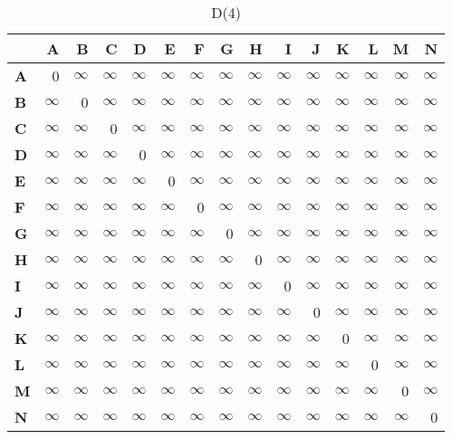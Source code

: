 \documentclass{article}
\newcommand{\INF}{$\infty$}
\begin{document}
\begin{table}[H]\centering
\caption{D(4)}
\begin{tabular}{l r r r r r r r r r r r r r r}
\toprule
 & \textbf{A} & \textbf{B} & \textbf{C} & \textbf{D} & \textbf{E} & \textbf{F} & \textbf{G} & \textbf{H} & \textbf{I} & \textbf{J} & \textbf{K} & \textbf{L} & \textbf{M} & \textbf{N}\\\midrule
\textbf{A} & 0 & \INF & \INF & \INF & \INF & \INF & \INF & \INF & \INF & \INF & \INF & \INF & \INF & \INF \\
\textbf{B} & \INF & 0 & \INF & \INF & \INF & \INF & \INF & \INF & \INF & \INF & \INF & \INF & \INF & \INF \\
\textbf{C} & \INF & \INF & 0 & \INF & \INF & \INF & \INF & \INF & \INF & \INF & \INF & \INF & \INF & \INF \\
\textbf{D} & \INF & \INF & \INF & 0 & \INF & \INF & \INF & \INF & \INF & \INF & \INF & \INF & \INF & \INF \\
\textbf{E} & \INF & \INF & \INF & \INF & 0 & \INF & \INF & \INF & \INF & \INF & \INF & \INF & \INF & \INF \\
\textbf{F} & \INF & \INF & \INF & \INF & \INF & 0 & \INF & \INF & \INF & \INF & \INF & \INF & \INF & \INF \\
\textbf{G} & \INF & \INF & \INF & \INF & \INF & \INF & 0 & \INF & \INF & \INF & \INF & \INF & \INF & \INF \\
\textbf{H} & \INF & \INF & \INF & \INF & \INF & \INF & \INF & 0 & \INF & \INF & \INF & \INF & \INF & \INF \\
\textbf{I} & \INF & \INF & \INF & \INF & \INF & \INF & \INF & \INF & 0 & \INF & \INF & \INF & \INF & \INF \\
\textbf{J} & \INF & \INF & \INF & \INF & \INF & \INF & \INF & \INF & \INF & 0 & \INF & \INF & \INF & \INF \\
\textbf{K} & \INF & \INF & \INF & \INF & \INF & \INF & \INF & \INF & \INF & \INF & 0 & \INF & \INF & \INF \\
\textbf{L} & \INF & \INF & \INF & \INF & \INF & \INF & \INF & \INF & \INF & \INF & \INF & 0 & \INF & \INF \\
\textbf{M} & \INF & \INF & \INF & \INF & \INF & \INF & \INF & \INF & \INF & \INF & \INF & \INF & 0 & \INF \\
\textbf{N} & \INF & \INF & \INF & \INF & \INF & \INF & \INF & \INF & \INF & \INF & \INF & \INF & \INF & 0 \\
\bottomrule
\end{tabular}
\end{table}
\end{document}
